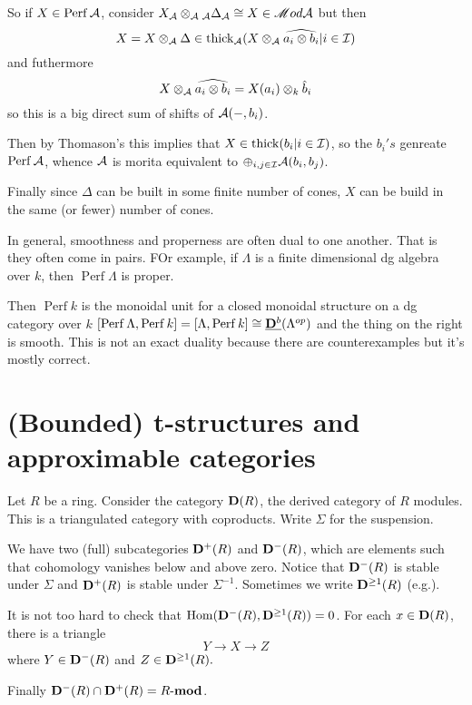 \documentclass[12pt]{article}
\begin{document}
So if $X\in\operatorname{Perf}\mathcal{A}$, consider $X_{\mathcal{A}}\otimes_{\mathcal{A}} {_{\mathcal{A}}}\Delta_{\mathcal{A}}\cong X\in\mathscr{M} od\mathcal{A}$
but then 
\[X=X\otimes_{\mathcal{A}} \Delta\in\operatorname{thick}_{\mathcal{A}}(X\otimes_{\mathcal{A}} \widehat{a_i\otimes b_i}|i\in\mathcal{I})\]
and futhermore 
\[X\otimes_{\mathcal{A}}\widehat{a_i\otimes b_i}= X(a_i)\otimes_k \hat b_i\]
so this is a big direct sum of shifts of $\mathcal{A}(-,b_i)$.

Then by Thomason's this implies that $X\in\operatorname{thick}(b_i|i\in\mathcal{I})$, so the $b_i's$ genreate $\operatorname{Perf}\mathcal{A}$, 
whence $\mathcal{A}$ is morita equivalent to $\oplus_{i,j\in\mathcal{I}}\mathcal{A}(b_i,b_j)$. 

Finally since $\Delta$ can be built in some finite number of cones, $X$ can be build in the same (or fewer) number of cones.

\begin{rmk}
	In general, smoothness and properness are often dual to one another. That is they often come in pairs. FOr example, if $\Lambda$ is a finite dimensional dg algebra over $k$, then $\operatorname{Perf}\Lambda$ is proper.

	Then $\operatorname{Perf}k$ is the monoidal unit for a closed monoidal structure on a dg category over $k$ $[\operatorname{Perf}\Lambda,\operatorname{Perf}k]=[\Lambda,\operatorname{Perf}k]\cong\underline{\mathbf{D}^b}(\Lambda^{op})$ and the thing on the right is smooth.
	This is not an exact duality because there are counterexamples but it's mostly correct.
\end{rmk}



\section{(Bounded) t-structures and approximable categories}
Let $R$ be a ring. Consider the category $\mathbf{D}(R)$, the derived category of $R$ modules. This is a triangulated category with 
coproducts. Write $\Sigma$ for the suspension.

We have two (full) subcategories $\mathbf{D}^+(R)$ and $\mathbf{D}^-(R)$, which are elements such that cohomology 
vanishes below and above zero. Notice that $\mathbf{D}^-(R)$ is stable under $\Sigma$ and $\mathbf{D}^+(R)$ is stable 
under $\Sigma^{-1}$. Sometimes we write $\mathbf{D}^{\ge 1}(R)$ (e.g.).

It is not too hard to check that $\operatorname{Hom}(\mathbf{D}^-(R),\mathbf{D}^{\ge 1}(R))=0$. For each $x\in\mathbf{D}(R)$, there is 
a triangle 
\[Y\to X\to Z\]
where $Y\in\mathbf{D}^-(R)$ and $Z\in\mathbf{D}^{\ge 1}(R).$

Finally $\mathbf{D}^-(R)\cap\mathbf{D}^+(R)=R\text{-}\mathbf{mod}$.
\end{document}
